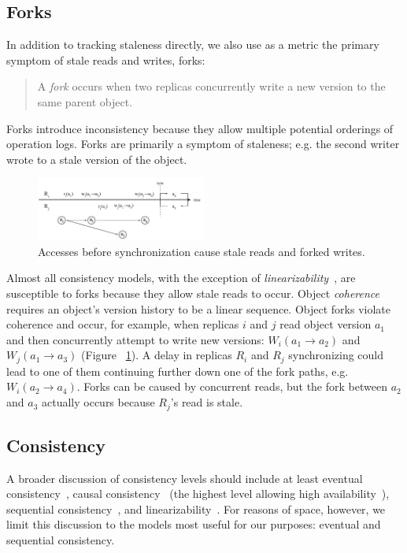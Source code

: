 \documentclass[10pt,conference,letterpaper]{IEEEtran}
\begin{document}
\subsection{Forks}

In addition to tracking staleness directly, we also use as a metric the primary symptom of stale
reads and writes, forks:
\begin{quote}
    A \emph{fork} occurs when two replicas concurrently write a new version to the same parent object.
\end{quote}
Forks introduce inconsistency because they allow multiple potential orderings of operation
logs.
Forks are primarily a symptom of staleness; e.g. the second writer wrote to
a stale version of the object.

\begin{figure}[t]
    \centering
    \includegraphics[width=0.5\textwidth]{figures/forks}
    \caption{Accesses before synchronization cause stale reads and forked writes.}
    \label{fig:forks}
\end{figure}

Almost all consistency models, with the exception of
\textit{linearizability}~\cite{herlihy_linearizability:_1990}, are susceptible to forks
because they allow stale reads to occur.
Object \emph{coherence} requires an object's version history to be a linear sequence.
Object forks violate coherence and occur, for example, when replicas $i$ and $j$ read object version $a_1$
and then concurrently attempt to write new versions: $W_i(a_1 \rightarrow a_2)$ and
$W_j(a_1 \rightarrow a_3)$ (Figure ~\ref{fig:forks}).
A delay in replicas $R_i$ and $R_j$ synchronizing could lead to one of them continuing
further down one of the fork paths, e.g. $W_i(a_2 \rightarrow a_4)$.
Forks can be caused by concurrent reads, but the fork between $a_2$ and $a_3$
actually occurs because $R_j$'s read is stale.

\subsection{Consistency}

A broader discussion of consistency levels should include at least eventual consistency~\cite{terry_managing_1995},
causal consistency~\cite{causal} (the highest level allowing high availability~\cite{bailis_bolt-causal_2013}),
sequential consistency~\cite{sequential-consistency}, and linearizability~\cite{herlihy_linearizability:_1990}.
For reasons of space, however, we limit this discussion to the models most
useful for our purposes:
eventual and sequential consistency.
\end{document}

